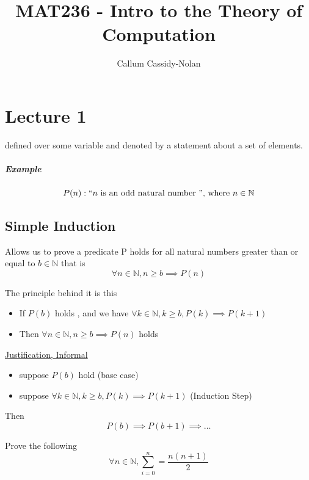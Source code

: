 \documentclass[11pt]{book}
\title{MAT236 - Intro to the Theory of Computation}
\author{Callum Cassidy-Nolan}
\begin{document}


\chapter{Lecture 1}%
\label{chp:lecture_1}

\begin{defn}[Predicate]\label{defn:predicate}
    defined over some variable and denoted by a statement about a set of elements.
    \paragraph{Example}
    \[
        P(n): `` n \text{ is an odd natural number }  "\text{, where } n \in \mathbb{N} 
    \]
\end{defn}

\section{Simple Induction}%
\label{sec:simple_induction}

Allows us to prove a predicate P holds for all natural numbers greater than or equal to $b\in \mathbb{N} $ that is 
\[
\forall n \in \mathbb{N}, n \ge b \implies P\left(n\right) 
\]

The principle behind it is this
\begin{itemize}
    \item If $P\left(b\right) $ holds , and we have $\forall k \in \mathbb{N} , k \ge b, P\left(k\right) \implies P\left(k + 1\right) $ 
    \item Then $\forall n \in \mathbb{N} , n \ge b \implies P\left(n\right) $ holds 
\end{itemize}

\underline{Justification, Informal}
\begin{itemize}
    \item suppose $P\left(b\right)  $  hold (base case) 
    \item suppose $\forall k \in \mathbb{N} , k \ge b, P\left(k\right) \implies P\left(k + 1\right) $ (Induction Step) 
\end{itemize}

Then 
\[
P\left(b\right) \implies P\left(b + 1\right) \implies \ldots 
\]

Prove the following 
\[
    \forall n \in \mathbb{N} , \sum_{i=0}^{n} = \frac{n\left( n + 1 \right) }{2} 
\]
\end{document}
